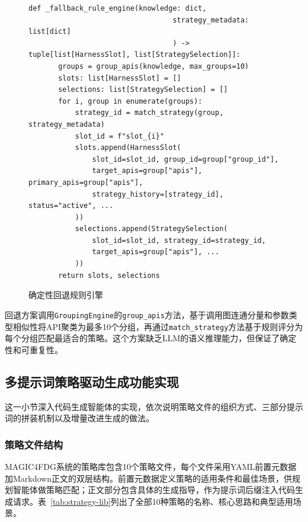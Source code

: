 \begin{figure}[H]
    \centering
    \begin{lstlisting}[style=style@python]
   def _fallback_rule_engine(knowledge: dict,
                                  strategy_metadata: list[dict]
                                  ) -> tuple[list[HarnessSlot], list[StrategySelection]]:
       groups = group_apis(knowledge, max_groups=10)
       slots: list[HarnessSlot] = []
       selections: list[StrategySelection] = []
       for i, group in enumerate(groups):
           strategy_id = match_strategy(group, strategy_metadata)
           slot_id = f"slot_{i}"
           slots.append(HarnessSlot(
               slot_id=slot_id, group_id=group["group_id"],
               target_apis=group["apis"], primary_apis=group["apis"],
               strategy_history=[strategy_id], status="active", ...
           ))
           selections.append(StrategySelection(
               slot_id=slot_id, strategy_id=strategy_id,
               target_apis=group["apis"], ...
           ))
       return slots, selections
    \end{lstlisting}
    \caption{确定性回退规则引擎}
    \label{fig:fallback-engine}
\end{figure}

回退方案调用\texttt{GroupingEngine}的\texttt{group\_apis}方法，基于调用图连通分量和参数类型相似性将API聚类为最多10个分组，再通过\texttt{match\_strategy}方法基于规则评分为每个分组匹配最适合的策略。这个方案缺乏LLM的语义推理能力，但保证了确定性和可重复性。

\subsection{多提示词策略驱动生成功能实现}

这一小节深入代码生成智能体的实现，依次说明策略文件的组织方式、三部分提示词的拼装机制以及增量改进生成的做法。

\subsubsection{策略文件结构}

MAGIC4FDG系统的策略库包含10个策略文件，每个文件采用YAML前置元数据加Markdown正文的双层结构。前置元数据定义策略的适用条件和最佳场景，供规划智能体做策略匹配；正文部分包含具体的生成指导，作为提示词后缀注入代码生成请求。表~\ref{tab:strategy-lib}列出了全部10种策略的名称、核心思路和典型适用场景。


